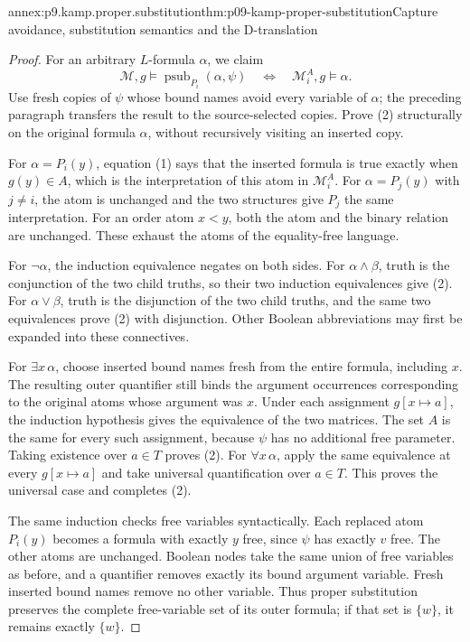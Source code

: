 \begin{annexitem}{annex:p9.kamp.proper.substitution}{thm:p09-kamp-proper-substitution}{Capture avoidance, substitution semantics and the D-translation}
\begin{proof}
For an arbitrary \(L\)-formula \(\alpha\), we claim
\[
 \mathcal M,g\models\operatorname{psub}_{P_i}(\alpha,\psi)
 \quad\Longleftrightarrow\quad
                         \mathcal M_i^A,g\models\alpha.
\tag{2}
\]
Use fresh copies of \(\psi\) whose bound names avoid every variable
of \(\alpha\); the preceding paragraph transfers the result to the
source-selected copies. Prove (2) structurally on the original formula
\(\alpha\), without recursively visiting an inserted copy.

For \(\alpha=P_i(y)\), equation (1) says that the inserted formula is
true exactly when \(g(y)\in A\), which is the interpretation of this
atom in \(\mathcal M_i^A\). For \(\alpha=P_j(y)\) with \(j\ne i\),
the atom is unchanged and the two structures give \(P_j\) the same
interpretation. For an order atom \(x<y\), both the atom and the binary
relation are unchanged. These exhaust the atoms of the equality-free
language.

For \(\neg\alpha\), the induction equivalence negates on both sides.
For \(\alpha\land\beta\), truth is the conjunction of the two child
truths, so their two induction equivalences give (2). For
\(\alpha\lor\beta\), truth is the disjunction of the two child
truths, and the same two equivalences prove (2) with disjunction. Other
Boolean abbreviations may first be expanded into these connectives.

For \(\exists x\,\alpha\), choose inserted bound names fresh from
the entire formula, including \(x\). The resulting outer quantifier
still binds the argument occurrences corresponding to the original atoms
whose argument was \(x\). Under each assignment \(g[x\mapsto a]\),
the induction hypothesis gives the equivalence of the two matrices.
The set \(A\) is the same for every such assignment, because \(\psi\)
has no additional free parameter. Taking existence over \(a\in T\)
proves (2). For \(\forall x\,\alpha\), apply the same equivalence
at every \(g[x\mapsto a]\) and take universal quantification over
\(a\in T\). This proves the universal case and completes (2).

The same induction checks free variables syntactically. Each replaced
atom \(P_i(y)\) becomes a formula with exactly \(y\) free, since
\(\psi\) has exactly \(v\) free. The other atoms are unchanged.
Boolean nodes take the same union of free variables as before, and a
quantifier removes exactly its bound argument variable. Fresh inserted
bound names remove no other variable. Thus proper substitution preserves
the complete free-variable set of its outer formula; if that set is
\(\{w\}\), it remains exactly \(\{w\}\).


\end{proof}
\end{annexitem}
